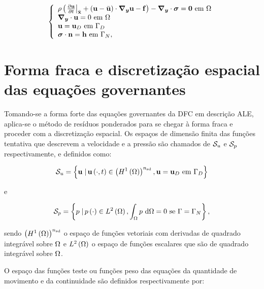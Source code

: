 \documentclass[tese_patricia]{subfiles}%
\begin{document}
\begin{equation}
	\left\{
	\begin{array}{l}
		\density\left( \left. \frac{\partial\velocity}{\partial t} \right|_{\posALE}  + \left(\velocity - \velocityALE \right)\cdot\gradient\velocity - \sbodyforce \right) - \divergence \cdot \stressTensor = \vzero  \ \textrm{em} \ \domain\\
		\divergence \cdot \velocity = 0  \ \textrm{em} \ \domain\\
		\velocity = \velocityD \ \textrm{em} \ \boundaryD \\
		\stressTensor \cdot \snormal = \surfaceLoad \ \textrm{em} \ \boundaryN,
	\end{array} \label{eq:conj_eq_DFC_ALE}
	\right.
\end{equation}


\section{Forma fraca e discretização espacial das equações governantes} \label{capitulo:Cap2:FormaFraca}

Tomando-se a forma forte das equações governantes da DFC em descrição ALE, aplica-se o método de resíduos ponderados para se chegar à forma fraca e proceder com a discretização espacial. Os espaços de dimensão finita das funções tentativa que descrevem a velocidade e a pressão são chamados de $\mathcal{S}_u$ e $\mathcal{S}_p$ respectivamente, e definidos como:

\begin{align}
\mathcal{S}_u = \left\{\mathbf{u} \left . \right| \mathbf{u} \left(\cdot,t\right) \in \left(H^{1}\left(\Omega\right)\right)^{{n_{\mathrm{sd}}}}, \mathbf{u} = \mathbf{u}_D \ \textrm {em} \ \Gamma_{D} \right\}
\end{align}

\noindent e

\begin{align}
\mathcal{S}_p = \left\{p \left . \right| p \left(\cdot\right) \in L^{2}\left(\Omega\right), \int_{\Omega}p \textrm { } \mathrm{d} \Omega = 0 \textrm { se } \Gamma = \Gamma_{N} \right\},
\end{align}

\noindent sendo $\left(H^{1}\left(\Omega\right)\right)^{{n_{\mathrm{sd}}}}$ o espaço de funções vetoriais com derivadas de quadrado integrável sobre $\Omega$ e $L^{2}\left(\Omega\right)$ o espaço de funções escalares que são de quadrado integrável sobre $\Omega$.

O espaço das funções teste ou funções peso das equações da quantidade de movimento e da continuidade são definidos respectivamente por:
\end{document}
